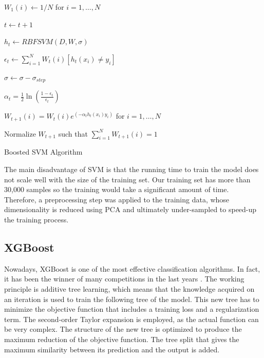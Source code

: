 \documentclass[conference]{IEEEtran}
\begin{document}
\begin{algorithm}

  $W_1(i) \leftarrow 1/N$ for $i=1,\dots,N$ %

    {
        $t \leftarrow t+1$

        $h_t \leftarrow RBFSVM(D,W,\sigma)$ 

        $\epsilon_t \leftarrow \sum^N_{i=1}W_t(i)[h_t(x_i)\neq y_i]$

        		{
		
		$\sigma \leftarrow \sigma - \sigma_{step}$
		
		}
	\Else
	{
	$\alpha_t = \frac{1}{2}\ln \left( \frac{1-\epsilon_t}{\epsilon_t} \right)$
	
	
	 $W_{t+1}(i) = W_t(i) e^{(-\alpha_th_t(x_i)y_i)}$ for $i=1,\dots,N$
	
	 Normalize $W_{t+1}$ such that $\sum^N_{i=1}W_{t+1}(i)=1$
	 }
    }
\caption{Boosted SVM Algorithm}
\end{algorithm}

The main disadvantage of SVM is that the running time to train the model does not scale well with the size of the training set\cite{boosting_svm}. Our training set has more than 30,000 samples so the training would take a significant amount of time. Therefore, a preprocessing step was applied to the training data, whose dimensionality is reduced using PCA and ultimately under-sampled to speed-up the training process.

\subsection{XGBoost}
Nowadays, XGBoost is one of the most effective classification algorithms. In fact, it has been the winner of many competitions in the last years \cite{xgboost}. The working principle is additive tree learning, which means that the knowledge acquired on an iteration is used to train the following tree of the model. This new tree has to minimize the objective function that includes a training loss and a regularization term. The second-order Taylor expansion is employed, as the actual function can be very complex. The structure of the new tree is optimized to produce the maximum reduction of the objective function. The tree split that gives the maximum similarity between its prediction and the output is added. 
\end{document}
